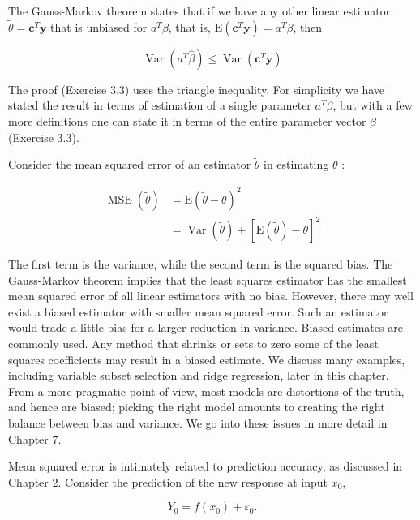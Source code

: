 \documentclass[10pt]{article}
\begin{document}
The Gauss-Markov theorem states that if we have any other linear estimator $\tilde{\theta}=\mathbf{c}^{T} \mathbf{y}$ that is unbiased for $a^{T} \beta$, that is, $\mathrm{E}\left(\mathbf{c}^{T} \mathbf{y}\right)=a^{T} \beta$, then


\begin{equation*}
\operatorname{Var}\left(a^{T} \hat{\beta}\right) \leq \operatorname{Var}\left(\mathbf{c}^{T} \mathbf{y}\right) \tag{3.19}
\end{equation*}


The proof (Exercise 3.3) uses the triangle inequality. For simplicity we have stated the result in terms of estimation of a single parameter $a^{T} \beta$, but with a few more definitions one can state it in terms of the entire parameter vector $\beta$ (Exercise 3.3).

Consider the mean squared error of an estimator $\tilde{\theta}$ in estimating $\theta$ :


\begin{align*}
\operatorname{MSE}(\tilde{\theta}) & =\mathrm{E}(\tilde{\theta}-\theta)^{2} \\
& =\operatorname{Var}(\tilde{\theta})+[\mathrm{E}(\tilde{\theta})-\theta]^{2} \tag{3.20}
\end{align*}


The first term is the variance, while the second term is the squared bias. The Gauss-Markov theorem implies that the least squares estimator has the smallest mean squared error of all linear estimators with no bias. However, there may well exist a biased estimator with smaller mean squared error. Such an estimator would trade a little bias for a larger reduction in variance. Biased estimates are commonly used. Any method that shrinks or sets to zero some of the least squares coefficients may result in a biased estimate. We discuss many examples, including variable subset selection and ridge regression, later in this chapter. From a more pragmatic point of view, most models are distortions of the truth, and hence are biased; picking the right model amounts to creating the right balance between bias and variance. We go into these issues in more detail in Chapter 7.

Mean squared error is intimately related to prediction accuracy, as discussed in Chapter 2. Consider the prediction of the new response at input $x_{0}$,


\begin{equation*}
Y_{0}=f\left(x_{0}\right)+\varepsilon_{0} . \tag{3.21}
\end{equation*}
\end{document}
